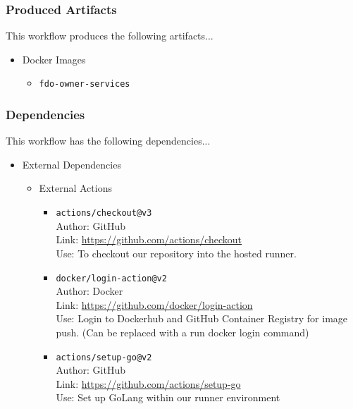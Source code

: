\documentclass[a4paper,11pt]{article}
\begin{document}
\subsubsection{Produced Artifacts}
This workflow produces the following artifacts...
\begin{itemize}
    \item Docker Images
    \begin{itemize}
        \item\verb|fdo-owner-services|
    \end{itemize}
\end{itemize}

\subsubsection{Dependencies}
This workflow has the following dependencies...
\begin{itemize}
    \item External Dependencies
    \begin{itemize}
        \item External Actions
        \begin{itemize}
            \item\verb|actions/checkout@v3|\\Author: GitHub\\Link: \href{https://github.com/actions/checkout}{https://github.com/actions/checkout}\\Use: To checkout our repository into the hosted runner.
            \item\verb|docker/login-action@v2|\\Author: Docker\\Link: \href{https://github.com/docker/login-action}{https://github.com/docker/login-action}\\Use: Login to Dockerhub and GitHub Container Registry for image push. (Can be replaced with a run docker login command)
            \item\verb|actions/setup-go@v2|\\Author: GitHub\\Link: \href{https://github.com/actions/setup-go}{https://github.com/actions/setup-go}\\Use: Set up GoLang within our runner environment
        \end{itemize}
    \end{itemize}
\end{itemize}
\end{document}
